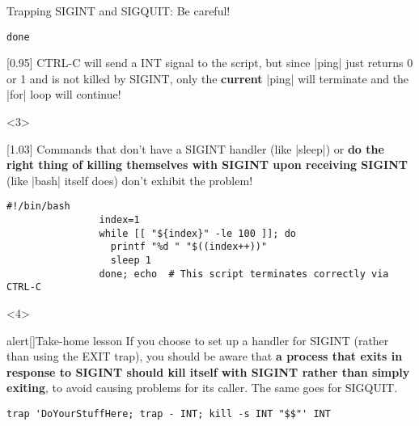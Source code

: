 \begin{frame}[fragile]{Trapping SIGINT and SIGQUIT: Be careful!}
\begin{overlayarea}{\textwidth}{0.7\textheight}
\begin{onlyenv}
\begin{lstlisting}[style=MyBash, belowskip=-5mm]
                done
            \end{lstlisting}
            \begin{varblock}{}[0.95\textwidth]{}
                \small CTRL-C will send a INT signal to the script, but since \bash|ping| just returns 0 or 1 and is not killed by SIGINT, only the \alert{\textbf{current}} \bash|ping| will terminate and the \bash|for| loop will continue!
            \end{varblock}
        \end{onlyenv}
        \begin{onlyenv}<3>
            \begin{varblock}{}[1.03\textwidth]{}
                Commands that don't have a SIGINT handler (like \bash|sleep|) or \textbf{do the right thing of killing themselves with SIGINT upon receiving SIGINT} (like \bash|bash| itself does) don't exhibit the problem!
            \end{varblock}
            \begin{lstlisting}[style=MyBash, firstnumber=5]
                #!/bin/bash
                index=1
                while [[ "${index}" -le 100 ]]; do
                  printf "%d " "$((index++))"
                  sleep 1
                done; echo  # This script terminates correctly via CTRL-C
            \end{lstlisting}
        \end{onlyenv}
        \begin{onlyenv}<4>
            \medskip
            \begin{varblock}{alert}[\textwidth]{Take-home lesson}
                If you choose to set up a handler for SIGINT (rather than using the EXIT trap), you should be aware that \alert{\textbf{a process that exits in response to SIGINT should kill itself with SIGINT rather than simply exiting}}, to avoid causing problems for its caller.
                The same goes for SIGQUIT.
            \end{varblock}
            \begin{lstlisting}[style=MyBash, numbers=none]
                trap 'DoYourStuffHere; trap - INT; kill -s INT "$$"' INT
            \end{lstlisting}
        \end{onlyenv}
    \end{overlayarea}
\end{frame}











